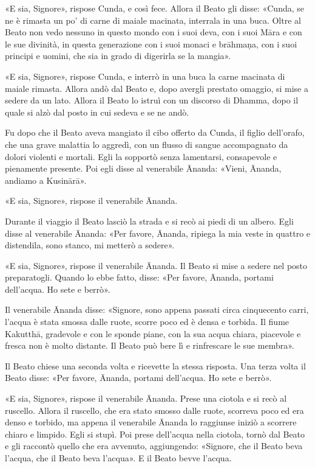 «E sia, Signore», rispose Cunda, e così fece. Allora il Beato gli disse:
«Cunda, se ne è rimasta un po’ di carne di maiale macinata, interrala in
una buca. Oltre al Beato non vedo nessuno in questo mondo con i suoi
deva, con i suoi Māra e con le sue divinità, in questa generazione con i
suoi monaci e brāhmaṇa, con i suoi principi e uomini, che sia in grado
di digerirla se la mangia».


«E sia, Signore», rispose Cunda, e interrò in una buca la carne macinata
di maiale rimasta. Allora andò dal Beato e, dopo avergli prestato
omaggio, si mise a sedere da un lato. Allora il Beato lo istruì con un
discorso di Dhamma, dopo il quale si alzò dal posto in cui sedeva e se
ne andò.


Fu dopo che il Beato aveva mangiato il cibo offerto da Cunda, il figlio
dell’orafo, che una grave malattia lo aggredì, con un flusso di sangue
accompagnato da dolori violenti e mortali. Egli la sopportò senza
lamentarsi, consapevole e pienamente presente. Poi egli disse al
venerabile Ānanda: «Vieni, Ānanda, andiamo a Kusinārā».


«E sia, Signore», rispose il venerabile Ānanda.


Durante il viaggio il Beato lasciò la strada e si recò ai piedi di un
albero. Egli disse al venerabile Ānanda: «Per favore, Ānanda, ripiega la
mia veste in quattro e distendila, sono stanco, mi metterò a sedere».


«E sia, Signore», rispose il venerabile Ānanda. Il Beato si mise a
sedere nel posto preparatogli. Quando lo ebbe fatto, disse: «Per favore,
Ānanda, portami dell’acqua. Ho sete e berrò».


Il venerabile Ānanda disse: «Signore, sono appena passati circa
cinquecento carri, l’acqua è stata smossa dalle ruote, scorre poco ed è
densa e torbida. Il fiume Kakutthā, gradevole e con le sponde piane, con
la sua acqua chiara, piacevole e fresca non è molto distante. Il Beato
può bere lì e rinfrescare le sue membra».


Il Beato chiese una seconda volta e ricevette la stessa risposta. Una
terza volta il Beato disse: «Per favore, Ānanda, portami dell’acqua. Ho
sete e berrò».


«E sia, Signore», rispose il venerabile Ānanda. Prese una ciotola e si
recò al ruscello. Allora il ruscello, che era stato smosso dalle ruote,
scorreva poco ed era denso e torbido, ma appena il venerabile Ānanda lo
raggiunse iniziò a scorrere chiaro e limpido. Egli si stupì. Poi prese
dell’acqua nella ciotola, tornò dal Beato e gli raccontò quello che era
avvenuto, aggiungendo: «Signore, che il Beato beva l’acqua, che il Beato
beva l’acqua». E il Beato bevve l’acqua.


